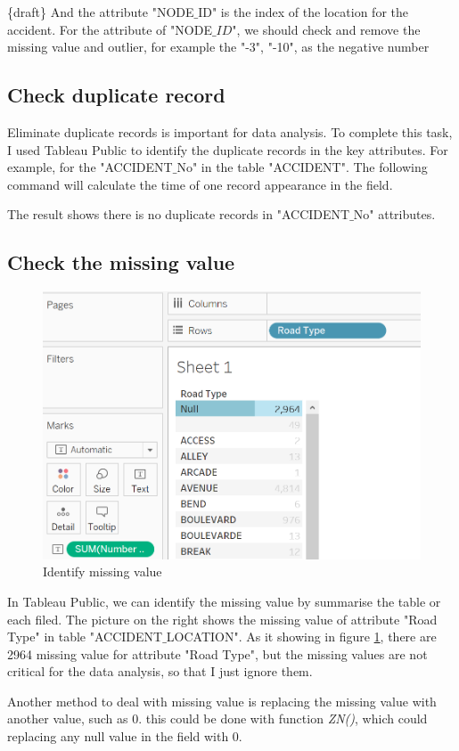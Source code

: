\documentclass[11pt]{article}
\theoremstyle{definition}
\begin{document}
\{draft\} And the attribute "NODE$\_$ID" is the index of the location for the accident. For the attribute of "NODE$\_ID$", we should check and remove the missing value and outlier, for example the "-3", "-10", as the negative number 

\subsection{Check duplicate record}
Eliminate duplicate records is important for data analysis. To complete this task, I used Tableau Public to identify the duplicate records in the key attributes. For example, for the "ACCIDENT$\_$No" in the table "ACCIDENT". The following command will calculate the time of one record appearance in the field. 
\begin{center}
\text{\{fixed[Accident$\_$No:SUM([Number of Records])\}}
\end{center}
The result shows there is no duplicate records in "ACCIDENT$\_$No" attributes.

\subsection{Check the missing value}
\begin{figure}
	\vspace{-35pt}
	\begin{center}
	\includegraphics[width=0.9\linewidth]{images/IdentifyMissingValue.png}
	\end{center}
	\caption{Identify missing value}
	\vspace{-0pt}
\label{fig:identifyMissingValue}
\end{figure}	
In Tableau Public, we can identify the missing value by summarise the table or each filed. The picture on the right shows the missing value of attribute "Road Type" in table "ACCIDENT$\_$LOCATION". As it showing in figure \ref{fig:identifyMissingValue}, there are 2964 missing value for attribute "Road Type", but the missing values are not critical for the data analysis, so that I just ignore them.\par
Another method to deal with missing value is replacing the missing value with another value, such as 0. this could be done with function \textit{ZN()}, which could replacing any null value in the field with 0. 
\end{document}
